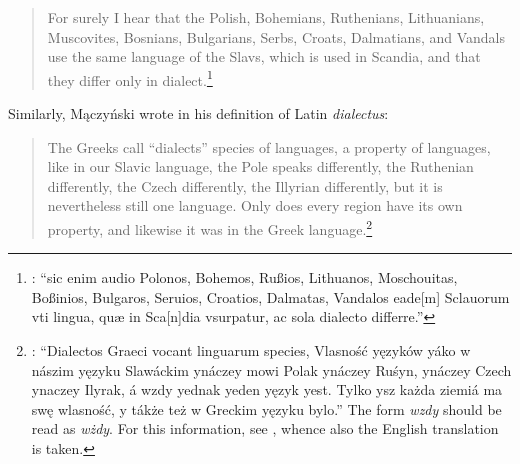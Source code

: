 \begin{quote}
    For surely I hear that the Polish, Bohemians, Ruthenians, Lithuanians, Muscovites, Bosnians, Bulgarians, Serbs, Croats, Dalmatians, and Vandals use the same language of the Slavs, which is used in Scandia, and that they differ only in dialect.\footnote{\citet[439]{bodin_methodus_1566}: “sic enim audio Polonos, Bohemos, Rußios, Lithuanos, Moschouitas, Boßinios, Bulgaros, Seruios, Croatios, Dalmatas, Vandalos eade[m] Sclauorum vti lingua, quæ in Sca[n]dia vsurpatur, ac sola dialecto differre.”}
\end{quote}

\noindent Similarly, Mączyński wrote in his definition of Latin \textit{dialectus}:

\begin{quote}
    The Greeks call “dialects” species of languages, a property of languages, like in our Slavic language, the Pole speaks differently, the Ruthenian differently, the Czech differently, the Illyrian differently, but it is nevertheless still one language. Only does every region have its own property, and likewise it was in the Greek language.\footnote{\citet[\textit{s.v. dialectus}]{maczynski_lexicon_1564}: “Dialectos Graeci vocant linguarum species, Vlasność yęzyków yáko w nászim yęzyku Slawáckim ynáczey mowi Polak ynáczey Ruśyn, ynáczey Czech ynaczey Ilyrak, á wzdy yednak yeden yęzyk yest. Tylko ysz każda ziemiá ma swę wlasność, y tákże też w Greckim yęzyku bylo.” The form \textit{wzdy} should be read as \textit{wżdy}. For this information, see \citet[33]{seldeslachts_every_2022}, whence also the English translation is taken.}
\end{quote}

